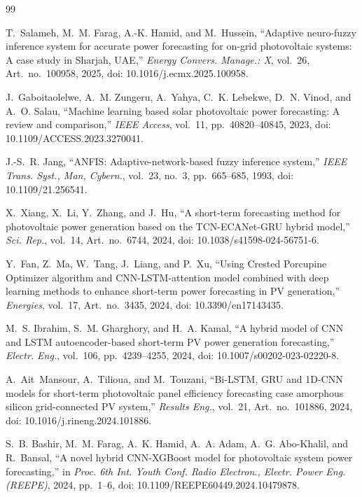 \documentclass[11pt,a4paper]{article}
\begin{document}
\begin{thebibliography}{99}
\small

T.~Salameh, M.~M. Farag, A.-K. Hamid, and M.~Hussein, ``Adaptive neuro-fuzzy inference system for accurate power forecasting for on-grid photovoltaic systems: A case study in Sharjah, UAE,'' \emph{Energy Convers. Manage.: X}, vol.~26, Art.~no.~100958, 2025, doi: 10.1016/j.ecmx.2025.100958.

J.~Gaboitaolelwe, A.~M. Zungeru, A.~Yahya, C.~K. Lebekwe, D.~N. Vinod, and A.~O. Salau, ``Machine learning based solar photovoltaic power forecasting: A review and comparison,'' \emph{IEEE Access}, vol.~11, pp.~40820--40845, 2023, doi: 10.1109/ACCESS.2023.3270041.

J.-S.~R. Jang, ``ANFIS: Adaptive-network-based fuzzy inference system,'' \emph{IEEE Trans. Syst., Man, Cybern.}, vol.~23, no.~3, pp.~665--685, 1993, doi: 10.1109/21.256541.

X.~Xiang, X.~Li, Y.~Zhang, and J.~Hu, ``A short-term forecasting method for photovoltaic power generation based on the TCN-ECANet-GRU hybrid model,'' \emph{Sci. Rep.}, vol.~14, Art.~no.~6744, 2024, doi: 10.1038/s41598-024-56751-6.

Y.~Fan, Z.~Ma, W.~Tang, J.~Liang, and P.~Xu, ``Using Crested Porcupine Optimizer algorithm and CNN-LSTM-attention model combined with deep learning methods to enhance short-term power forecasting in PV generation,'' \emph{Energies}, vol.~17, Art.~no.~3435, 2024, doi: 10.3390/en17143435.

M.~S. Ibrahim, S.~M. Gharghory, and H.~A. Kamal, ``A hybrid model of CNN and LSTM autoencoder-based short-term PV power generation forecasting,'' \emph{Electr. Eng.}, vol.~106, pp.~4239--4255, 2024, doi: 10.1007/s00202-023-02220-8.

A.~Ait~Mansour, A.~Tilioua, and M.~Touzani, ``Bi-LSTM, GRU and 1D-CNN models for short-term photovoltaic panel efficiency forecasting case amorphous silicon grid-connected PV system,'' \emph{Results Eng.}, vol.~21, Art.~no.~101886, 2024, doi: 10.1016/j.rineng.2024.101886.

S.~B. Bashir, M.~M. Farag, A.~K. Hamid, A.~A. Adam, A.~G. Abo-Khalil, and R.~Bansal, ``A novel hybrid CNN-XGBoost model for photovoltaic system power forecasting,'' in \emph{Proc. 6th Int. Youth Conf. Radio Electron., Electr. Power Eng. (REEPE)}, 2024, pp.~1--6, doi: 10.1109/REEPE60449.2024.10479878.


\end{thebibliography}
\end{document}
